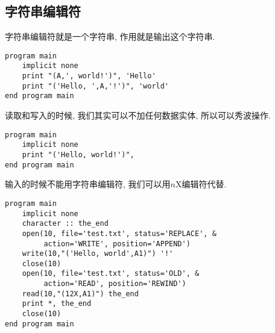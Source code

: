 \subsection{字符串编辑符}\label{character_string_edit_descriptor}

字符串编辑符就是一个字符串, 作用就是输出这个字符串.
\begin{lstlisting}
program main
    implicit none
    print "(A,', world!')", 'Hello'
    print "('Hello, ',A,'!')", 'world'
end program main
\end{lstlisting}
读取和写入的时候, 我们其实可以不加任何数据实体, 所以可以秀波操作.
\begin{lstlisting}
program main
    implicit none
    print "('Hello, world!')",
end program main
\end{lstlisting}
输入的时候不能用字符串编辑符, 我们可以用$n$X编辑符代替.
\begin{lstlisting}
program main
    implicit none
    character :: the_end
    open(10, file='test.txt', status='REPLACE', &
         action='WRITE', position='APPEND')
    write(10,"('Hello, world',A1)") '!'
    close(10)
    open(10, file='test.txt', status='OLD', &
         action='READ', position='REWIND')
    read(10,"(12X,A1)") the_end
    print *, the_end
    close(10)
end program main
\end{lstlisting}
